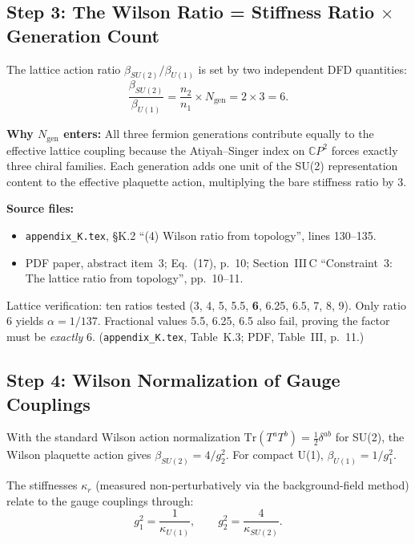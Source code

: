 \documentclass[11pt]{article}
\begin{document}
\subsection{Step 3: The Wilson Ratio = Stiffness Ratio $\times$ Generation Count}

The lattice action ratio $\beta_{SU(2)}/\beta_{U(1)}$ is set by two
independent DFD quantities:
\begin{equation}\label{eq:wilson-ratio}
\boxed{\frac{\beta_{SU(2)}}{\beta_{U(1)}}
  = \frac{n_2}{n_1} \times N_{\mathrm{gen}}
  = 2 \times 3 = 6.}
\end{equation}

\textbf{Why $N_{\mathrm{gen}}$ enters:} All three fermion generations
contribute equally to the effective lattice coupling because the
Atiyah--Singer index on $\mathbb{C}P^2$ forces exactly three chiral
families. Each generation adds one unit of the SU(2) representation
content to the effective plaquette action, multiplying the bare
stiffness ratio by 3.

\textbf{Source files:}
\begin{itemize}
\item \texttt{appendix\_K.tex}, \S K.2 ``(4) Wilson ratio from topology'',
      lines 130--135.
\item PDF paper, abstract item~3; Eq.~(17), p.~10; Section~III\,C
      ``Constraint~3: The lattice ratio from topology'', pp.~10--11.
\end{itemize}

Lattice verification: ten ratios tested (3, 4, 5, 5.5, \textbf{6}, 6.25,
6.5, 7, 8, 9). Only ratio 6 yields $\alpha = 1/137$. Fractional values
5.5, 6.25, 6.5 also fail, proving the factor must be \emph{exactly} 6.
(\texttt{appendix\_K.tex}, Table~K.3; PDF, Table~III, p.~11.)


\subsection{Step 4: Wilson Normalization of Gauge Couplings}

With the standard Wilson action normalization
$\mathrm{Tr}(T^a T^b) = \frac{1}{2}\delta^{ab}$ for SU(2),
the Wilson plaquette action gives $\beta_{SU(2)} = 4/g_2^2$.
For compact U(1), $\beta_{U(1)} = 1/g_1^2$.

The stiffnesses $\kappa_r$ (measured non-perturbatively via the
background-field method) relate to the gauge couplings through:
\begin{equation}\label{eq:g-from-kappa}
g_1^2 = \frac{1}{\kappa_{U(1)}}, \qquad
g_2^2 = \frac{4}{\kappa_{SU(2)}}.
\end{equation}
\end{document}

